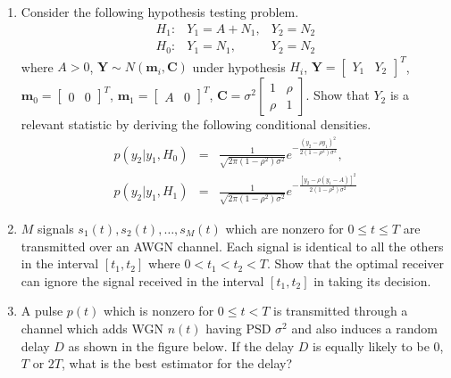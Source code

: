 \documentclass[10pt]{report}
\begin{document}
\begin{enumerate}
  \item Consider the following hypothesis testing problem.
    \begin{equation*}
      \begin{array}{lll}
        H_1 : & Y_1 = A+N_1,& Y_2 = N_2 \\
        H_0 : & Y_1 = N_1,& Y_2 = N_2 
      \end{array}
    \end{equation*}
    where $A >0$, $\mathbf{Y} \sim N(\mathbf{m}_i,\mathbf{C})$ under hypothesis $H_i$, $\mathbf{Y} = \begin{bmatrix} Y_1 & Y_2 \end{bmatrix}^T$, $\mathbf{m}_0 = \begin{bmatrix} 0 & 0 \end{bmatrix}^T$, $\mathbf{m}_1 = \begin{bmatrix} A & 0 \end{bmatrix}^T$, $\mathbf{C} = \sigma^2 \begin{bmatrix} 1 & \rho \\ \rho & 1 \end{bmatrix}$. Show that $Y_2$ is a relevant statistic by deriving the following conditional densities.
    \begin{eqnarray*}
      p(y_2|y_1,H_0) & = & \frac{1}{\sqrt{2\pi(1-\rho^2) \sigma^2}} e^{-\frac{(y_2-\rho y_1)^2}{2(1-\rho^2)\sigma^2}},\\ 
      p(y_2|y_1,H_1) & = & \frac{1}{\sqrt{2\pi(1-\rho^2) \sigma^2}} e^{-\frac{[y_2-\rho (y_1-A)]^2}{2(1-\rho^2)\sigma^2}}
    \end{eqnarray*}
  \item $M$ signals $s_1(t), s_2(t), \ldots, s_M(t)$ which are nonzero for $0 \leq t \leq T$ are transmitted over an AWGN channel. Each signal is identical to all the others in the interval $[t_1,t_2]$ where $0 < t_1 < t_2 < T$. Show that the optimal receiver can ignore the signal received in the interval $[t_1,t_2]$ in taking its decision.
  \item A pulse $p(t)$ which is nonzero for $0 \leq t <T$ is transmitted through a channel which adds WGN $n(t)$ having PSD $\sigma^2$ and also induces a random delay $D$ as shown in the figure below. If the delay $D$ is equally likely to be $0$, $T$ or $2T$, what is the best estimator for the delay?
    \begin{figure}[h]
      \centering
        \begin{tikzpicture}[scale=1.0,transform shape]

\end{tikzpicture}
\end{figure}
\end{enumerate}
\end{document}
